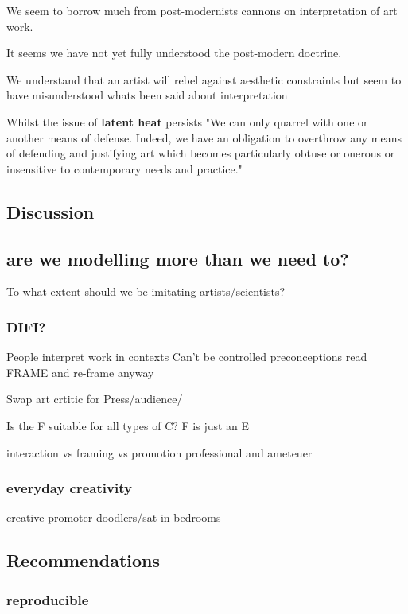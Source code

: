 \documentclass[11pt]{article}
\begin{document}
We seem to borrow much from post-modernists cannons on interpretation of art work.

It seems we have not yet fully understood the post-modern doctrine.

We understand that an artist will rebel against aesthetic constraints \cite{colton:2008a} but seem to have misunderstood whats been said about interpretation

Whilst the issue of \textbf{latent heat} persists "We can only quarrel with one or another means of defense. Indeed, we have an obligation to overthrow any means of defending and justifying art which becomes particularly obtuse or onerous or insensitive to contemporary needs and practice." 
\cite{Sontag1966}

\subsection{Discussion}
\label{sec:orgcc09bcc}
\subsection{are we modelling more than we need to?}
\label{sec:org8bacc2f}

To what extent should we be imitating artists/scientists?

\subsubsection{DIFI?}
\label{sec:orgc626e15}
People interpret work in contexts
Can't be controlled
preconceptions
read FRAME and re-frame anyway

Swap art crtitic for Press/audience/

Is the F suitable for all types of C?
F is just an E

interaction vs framing vs promotion
professional and ameteuer

\subsubsection{everyday creativity}
\label{sec:org67fee6f}

creative promoter
doodlers/sat in bedrooms

\subsection{Recommendations}
\label{sec:org0a1ca89}
\subsubsection{reproducible}
\label{sec:org6f752f2}
\end{document}

